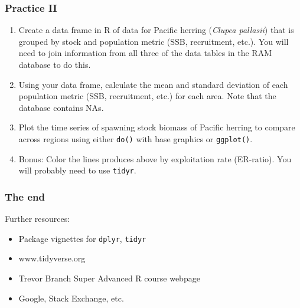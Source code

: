 \documentclass{beamer}\usepackage[]{graphicx}\usepackage[]{color}
\makeatletter
\newcommand{\hlstr}[1]{\textcolor[rgb]{0.192,0.494,0.8}{#1}}%
\newcommand{\hlopt}[1]{\textcolor[rgb]{0,0,0}{#1}}%
\newcommand{\hlstd}[1]{\textcolor[rgb]{0.345,0.345,0.345}{#1}}%
\newcommand{\hlkwb}[1]{\textcolor[rgb]{0.69,0.353,0.396}{#1}}%
\newcommand{\hlkwc}[1]{\textcolor[rgb]{0.333,0.667,0.333}{#1}}%
\newcommand{\hlkwd}[1]{\textcolor[rgb]{0.737,0.353,0.396}{\textbf{#1}}}%
\newenvironment{kframe}{%
 \def\at@end@of@kframe{}%
 \ifinner\ifhmode%
  \def\at@end@of@kframe{\end{minipage}}%
  \begin{minipage}{\columnwidth}%
 \fi\fi%
 \def\FrameCommand##1{\hskip\@totalleftmargin \hskip-\fboxsep
 \colorbox{shadecolor}{##1}\hskip-\fboxsep
     \hskip-\linewidth \hskip-\@totalleftmargin \hskip\columnwidth}%
 \MakeFramed {\advance\hsize-\width
   \@totalleftmargin\z@ \linewidth\hsize
   \@setminipage}}%
 {\par\unskip\endMakeFramed%
 \at@end@of@kframe}
\newenvironment{knitrout}{}{} %
\makeatother
\begin{document}
 
\begin{frame}
  \frametitle{Practice II}
  \begin{enumerate}
    \item Create a data frame in R of data for Pacific herring (\textit{Clupea pallasii}) that is grouped by stock and population metric (SSB, recruitment, etc.). You will need to join information from all three of the data tables in the RAM database to do this.
    \item Using your data frame, calculate the mean and standard deviation of each population metric (SSB, recruitment, etc.) for each area. Note that the database contains NAs.
    \item Plot the time series of spawning stock biomass of Pacific herring to compare across regions using either \texttt{do()} with base graphics or \texttt{ggplot()}.
    \item Bonus: Color the lines produces above by exploitation rate (ER-ratio). You will probably need to use \texttt{tidyr}.
  \end{enumerate}
\end{frame}



\begin{frame}
  \frametitle{The end}
  Further resources:
    \begin{itemize}
      \item Package vignettes for \texttt{dplyr}, \texttt{tidyr}
      \item www.tidyverse.org
      \item Trevor Branch Super Advanced R course webpage
      \item Google, Stack Exchange, etc.
    \end{itemize}
\end{frame}
\end{document}
